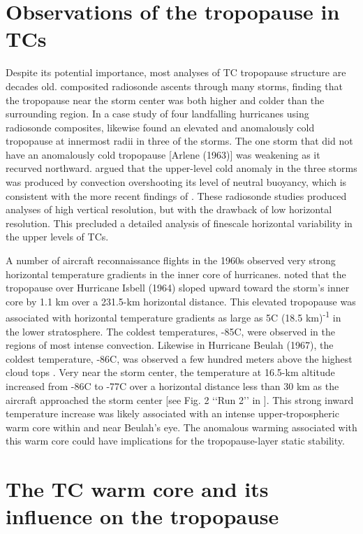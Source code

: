 \section{Observations of the tropopause in TCs}
Despite its potential importance, most analyses of TC tropopause structure are decades old.
\cite{JordanJordan1954} composited radiosonde ascents through many storms, finding that the tropopause near the storm center was both higher and colder than the surrounding region.
In a case study of four landfalling hurricanes using radiosonde composites, \cite{Koteswaram1967} likewise found an elevated and anomalously cold tropopause at innermost radii in three of the storms.
The one storm that did not have an anomalously cold tropopause [Arlene (1963)] was weakening as it recurved northward.
\cite{Koteswaram1967} argued that the upper-level cold anomaly in the three storms was produced by convection overshooting its level of neutral buoyancy, which is consistent with the more recent findings of \cite{Davisetal2014}.
These radiosonde studies produced analyses of high vertical resolution, but with the drawback of low horizontal resolution.
This precluded a detailed analysis of finescale horizontal variability in the upper levels of TCs.

A number of aircraft reconnaissance flights in the 1960s observed very strong horizontal temperature gradients in the inner core of hurricanes.
\cite{Penn1966} noted that the tropopause over Hurricane Isbell (1964) sloped upward toward the storm’s inner core by 1.1 km over a 231.5-km horizontal distance.
This elevated tropopause was associated with horizontal temperature gradients as large as 5\textdegree{}C (18.5 km)\textsuperscript{-1} in the lower stratosphere.
The coldest temperatures, -85\textdegree{}C, were observed in the regions of most intense convection.
Likewise in Hurricane Beulah (1967), the coldest temperature, -86\textdegree{}C, was observed a few hundred meters above the highest cloud tops \citep{Waco1970}.
Very near the storm center, the temperature at 16.5-km altitude increased from -86\textdegree{}C to -77\textdegree{}C over a horizontal distance less than 30 km as the aircraft approached the storm center [see Fig. 2 ‘‘Run 2’’ in \cite{Waco1970}].
This strong inward temperature increase was likely associated with an intense upper-tropospheric warm core within and near Beulah’s eye.
The anomalous warming associated with this warm core could have implications for the tropopause-layer static stability.

\section{The TC warm core and its influence on the tropopause}

